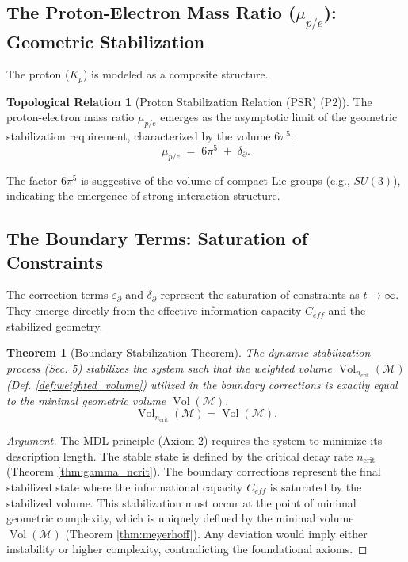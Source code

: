 \documentclass[11pt, a4paper]{article}
\newtheorem{theorem}{Theorem}[section]
\theoremstyle{definition}
\newtheorem{identity}{Topological Relation}[section]
\theoremstyle{definition}
\newcommand{\M}{\mathcal{M}}
\newcommand{\Vol}{\operatorname{Vol}}
\newcommand{\Veight}{\Vol(\M)}
\newcommand{\VolNcrit}{\Vol_{\ncrit}}
\newcommand{\ncrit}{n_{\mathrm{crit}}}
\newcommand{\Bzero}{6\pi^5}
\begin{document}
\subsection{The Proton-Electron Mass Ratio (\texorpdfstring{$\mu_{p/e}$}{mu p/e}): Geometric Stabilization}

The proton ($K_p$) is modeled as a composite structure.

\begin{identity}[Proton Stabilization Relation (PSR) (P2)]
The proton-electron mass ratio $\mu_{p/e}$ emerges as the asymptotic limit of the geometric stabilization requirement, characterized by the volume $6\pi^5$:
\begin{equation}
  \mu_{p/e} \;=\; \Bzero \;+\; \delta_{\partial}. \label{eq:P2_full}
\end{equation}
\end{identity}
The factor $6\pi^5$ is suggestive of the volume of compact Lie groups (e.g., $SU(3)$), indicating the emergence of strong interaction structure.

\subsection{The Boundary Terms: Saturation of Constraints}

The correction terms $\varepsilon_\partial$ and $\delta_\partial$ represent the saturation of constraints as $t \to \infty$. They emerge directly from the effective information capacity $C_{eff}$ and the stabilized geometry.

\begin{theorem}[Boundary Stabilization Theorem]\label{thm:boundary_stabilization}
The dynamic stabilization process (Sec. 5) stabilizes the system such that the weighted volume $\VolNcrit(\M)$ (Def. \ref{def:weighted_volume}) utilized in the boundary corrections is exactly equal to the minimal geometric volume $\Veight$.
\begin{equation}
    \VolNcrit(\M) = \Veight.
\end{equation}
\end{theorem}
\begin{proof}[Argument]
The MDL principle (Axiom 2) requires the system to minimize its description length. The stable state is defined by the critical decay rate $\ncrit$ (Theorem \ref{thm:gamma_ncrit}). The boundary corrections represent the final stabilized state where the informational capacity $C_{eff}$ is saturated by the stabilized volume. This stabilization must occur at the point of minimal geometric complexity, which is uniquely defined by the minimal volume $\Veight$ (Theorem \ref{thm:meyerhoff}). Any deviation would imply either instability or higher complexity, contradicting the foundational axioms.
\end{proof}
\end{document}

